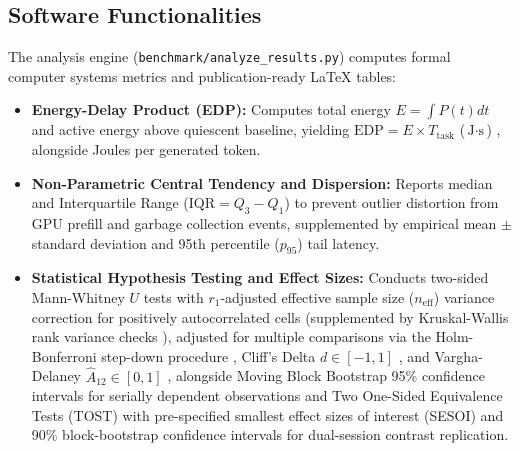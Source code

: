 \documentclass[11pt,a4paper]{article}
\begin{document}
\subsection{Software Functionalities}
The analysis engine (\texttt{benchmark/analyze\_results.py}) computes formal computer systems metrics and publication-ready LaTeX tables:
\begin{itemize}
    \item \textbf{Energy-Delay Product (EDP):} Computes total energy $E = \int P(t) dt$ and active energy above quiescent baseline, yielding $\text{EDP} = E \times T_{\text{task}}$ ($\text{J}\cdot\text{s}$) \cite{barroso2007case, you2023zeus}, alongside Joules per generated token.
    \item \textbf{Non-Parametric Central Tendency and Dispersion:} Reports median and Interquartile Range ($\text{IQR} = Q_3 - Q_1$) to prevent outlier distortion from GPU prefill and garbage collection events, supplemented by empirical mean $\pm$ standard deviation and 95th percentile ($p_{95}$) tail latency.
    \item \textbf{Statistical Hypothesis Testing and Effect Sizes:} Conducts two-sided Mann-Whitney $U$ tests \cite{mann1947test} with $r_1$-adjusted effective sample size ($n_{\text{eff}}$) variance correction for positively autocorrelated cells \cite{bayley1946effective, yue2004mann, zimmerman1993rank, fagerland2009wilcoxon} (supplemented by Kruskal-Wallis rank variance checks \cite{kruskal1952use}), adjusted for multiple comparisons via the Holm-Bonferroni step-down procedure \cite{holm1979simple}, Cliff's Delta $d \in [-1, 1]$ \cite{cliff1993dominance}, and Vargha-Delaney $\hat{A}_{12} \in [0, 1]$ \cite{vargha2000critique}, alongside Moving Block Bootstrap 95\% confidence intervals for serially dependent observations \cite{kuensch1989jackknife} and Two One-Sided Equivalence Tests (TOST) with pre-specified smallest effect sizes of interest (SESOI) and 90\% block-bootstrap confidence intervals \cite{schuirmann1987comparison, lakens2017equivalence} for dual-session contrast replication.
\end{itemize}
\end{document}
